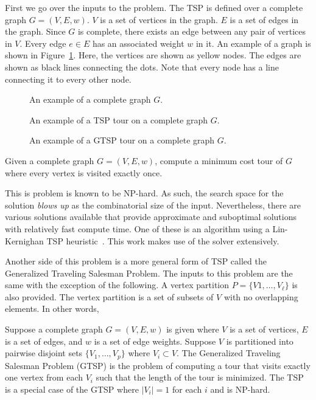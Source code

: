 \documentclass[../main.tex]{subfiles}
\begin{document}
First we go over the inputs to the problem. The TSP is defined over a complete graph $G=(V,E,w)$. $V$ is a set of vertices in the graph. $E$ is a set of edges in the graph. Since $G$ is complete, there exists an edge between any pair of vertices in $V$. Every edge $e\in E$ has an associated weight $w$ in it. An example of a graph is shown in Figure~\ref{fig:complete_graph}. Here, the vertices are shown as yellow nodes. The edges are shown as black lines connecting the dots. Note that every node has a line connecting it to every other node.
\begin{figure}
	\centering
	
	\caption{An example of a complete graph $G$.}
	\label{fig:complete_graph}
\end{figure}

\begin{figure}
	\centering
	
	\caption{An example of a TSP tour on a complete graph $G$.}
	\label{fig:tsp_tour}
\end{figure}

\begin{figure}
	\centering
	
	\caption{An example of a GTSP tour on a complete graph $G$.}
	\label{fig:gtsp_tour}
\end{figure}

\begin{problem}
Given a complete graph $G=(V,E,w)$, compute a minimum cost tour of $G$ where every vertex is visited exactly once.
\end{problem}

This is problem is known to be NP-hard. As such, the search space for the solution \emph{blows up} as the combinatorial size of the input. Nevertheless, there are various solutions available that provide approximate and suboptimal solutions with relatively fast compute time. One of these is an algorithm using a Lin-Kernighan TSP heuristic~\cite{helsgaun2009general}. This work makes use of the solver extensively.

Another side of this problem is a more general form of TSP called the Generalized Traveling Salesman Problem. The inputs to this problem are the same with the exception of the following. A vertex partition $P=\{V1,\ldots,V_{\ell}\}$ is also provided. The vertex partition is a set of subsets of $V$ with no overlapping elements. In other words, 

Suppose a complete graph $G=(V,E,w)$ is given where $V$ is a set of vertices, $E$ is a set of edges, and $w$ is a set of edge weights. Suppose $V$ is partitioned into pairwise disjoint sets $\{V_1,\ldots,V_p\}$ where $V_i\subset V$. The Generalized Traveling Salesman Problem (GTSP) is the problem of computing a tour that visits exactly one vertex from each $V_i$ such that the length of the tour is minimized. The TSP is a special case of the GTSP where $|V_i|=1$ for each $i$ and is NP-hard.
\end{document}
